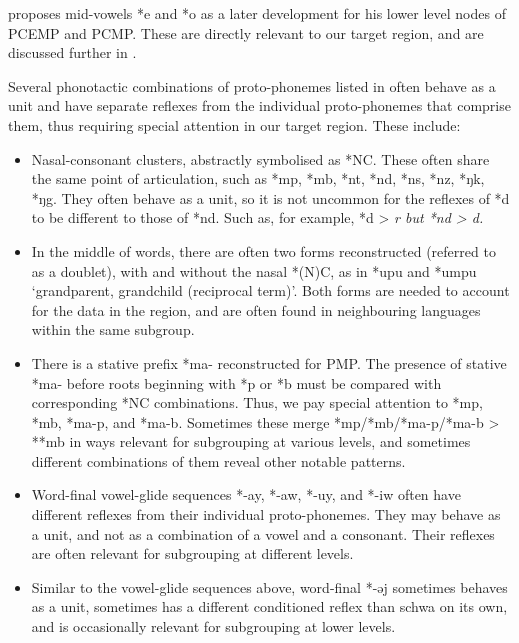 \citet{Blust2013} proposes mid-vowels *e
and *o as a later development for his lower level
nodes of PCEMP and PCMP.
These are directly relevant to our target region,
and are discussed further in .

Several phonotactic combinations of proto-phonemes
listed in  often behave as a unit
and have separate reflexes from the individual proto-phonemes that comprise them,
thus requiring special attention in our target region.
These include:

\begin{itemize}
	\item Nasal-consonant clusters,
				abstractly symbolised as *NC.
				These often share the same point of articulation,
				such as *mp, *mb, *nt, *nd, *ns, *nz, *ŋk, *ŋg.
				They often behave as a unit,
				so it is not uncommon for the reflexes of *d to be different to those of *nd.
				Such as, for example,
				*d > \it{r} but *nd > \it{d}.
	\item In the middle of words,
				there are often two forms reconstructed (referred to as a doublet),
				with and without the nasal *(N)C, as in *upu and *umpu ‘grandparent,
				grandchild (reciprocal term)’.
				Both forms are needed to account for the data in the region,
				and are often found in neighbouring languages within the same subgroup.
	\item There is a stative prefix *ma- reconstructed for PMP.
				The presence of stative *ma- before roots beginning with *p or *b
				must be compared with corresponding *NC combinations.
				Thus, we pay special attention to *mp, *mb, *ma-p, and *ma-b.
				Sometimes these merge *mp/*mb/*ma-p/*ma-b > **mb
				in ways relevant for subgrouping at various levels,
				and sometimes different combinations of them reveal other notable patterns.
	\item Word-final vowel-glide sequences *-ay, *-aw, *-uy,
				and *-iw often have different reflexes
				from their individual proto-phonemes.
				They may behave as a unit,
				and not as a combination of a vowel and a consonant.
				Their reflexes are often relevant for subgrouping at different levels.
	\item Similar to the vowel-glide sequences above,
				word-final *-əj sometimes behaves as a unit,
				sometimes has a different conditioned reflex than schwa on its own,
				and is occasionally relevant for subgrouping at lower levels.
\end{itemize}


